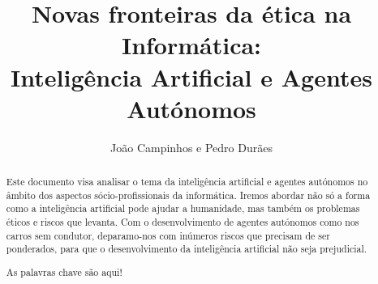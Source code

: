 \documentclass[runningheads,a4paper]{llncs}
\newcommand{\keywords}[1]{\par\addvspace\baselineskip\noindent\keywordname\enspace\ignorespaces#1}
\begin{document}
\mainmatter%

\title{Novas fronteiras da ética na Informática:\\Inteligência Artificial e Agentes Autónomos}


%
%
\author{João Campinhos e Pedro Durães}
%


%
%

\maketitle


\begin{abstract}
Este documento visa analisar o tema da inteligência artificial e agentes autónomos no âmbito dos aspectos sócio-profissionais da informática.
Iremos abordar não só a forma como a inteligência artificial pode ajudar a humanidade, mas também os problemas éticos e riscos que levanta.
Com o desenvolvimento de agentes autónomos como nos carros sem condutor, deparamo-nos com inúmeros riscos que precisam de ser ponderados, para que o desenvolvimento da inteligência artificial não seja prejudicial.
\keywords{As palavras chave são aqui!}
\end{abstract}
\end{document}
